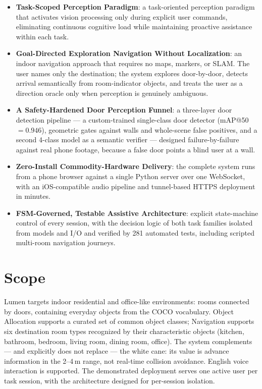 \begin{itemize}
    \item \textbf{Task-Scoped Perception Paradigm}: a task-oriented perception
          paradigm that activates vision processing only during explicit user
          commands, eliminating continuous cognitive load while maintaining
          proactive assistance within each task.

    \item \textbf{Goal-Directed Exploration Navigation Without Localization}: an
          indoor navigation approach that requires no maps, markers, or SLAM. The
          user names only the destination; the system explores door-by-door,
          detects arrival semantically from room-indicator objects, and treats the
          user as a direction oracle only when perception is genuinely ambiguous.

    \item \textbf{A Safety-Hardened Door Perception Funnel}: a three-layer door
          detection pipeline --- a custom-trained single-class door detector
          (mAP@50 $=0.946$), geometric gates against walls and whole-scene false
          positives, and a second 4-class model as a semantic verifier --- designed
          failure-by-failure against real phone footage, because a false door
          points a blind user at a wall.

    \item \textbf{Zero-Install Commodity-Hardware Delivery}: the complete system
          runs from a phone browser against a single Python server over one
          WebSocket, with an iOS-compatible audio pipeline and tunnel-based HTTPS
          deployment in minutes.

    \item \textbf{FSM-Governed, Testable Assistive Architecture}: explicit
          state-machine control of every session, with the decision logic of both
          task families isolated from models and I/O and verified by 281
          automated tests, including scripted multi-room navigation journeys.
\end{itemize}

\section{Scope}
\label{sec:scope}

Lumen targets indoor residential and office-like environments: rooms connected by
doors, containing everyday objects from the COCO vocabulary. Object Allocation
supports a curated set of common object classes; Navigation supports six destination
room types recognized by their characteristic objects (kitchen, bathroom, bedroom,
living room, dining room, office). The system complements --- and explicitly does not
replace --- the white cane: its value is advance information in the 2--4\,m range,
not real-time collision avoidance. English voice interaction is supported. The
demonstrated deployment serves one active user per task session, with the
architecture designed for per-session isolation.

